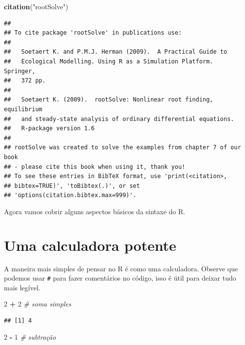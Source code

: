 \documentclass[
]{article}
\newenvironment{Shaded}{\begin{snugshade}}{\end{snugshade}}
\newcommand{\CommentTok}[1]{\textcolor[rgb]{0.56,0.35,0.01}{\textit{#1}}}
\newcommand{\DecValTok}[1]{\textcolor[rgb]{0.00,0.00,0.81}{#1}}
\newcommand{\KeywordTok}[1]{\textcolor[rgb]{0.13,0.29,0.53}{\textbf{#1}}}
\newcommand{\NormalTok}[1]{#1}
\newcommand{\OperatorTok}[1]{\textcolor[rgb]{0.81,0.36,0.00}{\textbf{#1}}}
\newcommand{\StringTok}[1]{\textcolor[rgb]{0.31,0.60,0.02}{#1}}
\begin{document}
\begin{Shaded}
\begin{Highlighting}[]
\KeywordTok{citation}\NormalTok{(}\StringTok{"rootSolve"}\NormalTok{)}
\end{Highlighting}
\end{Shaded}

\begin{verbatim}
## 
## To cite package 'rootSolve' in publications use:
## 
##   Soetaert K. and P.M.J. Herman (2009).  A Practical Guide to
##   Ecological Modelling. Using R as a Simulation Platform.  Springer,
##   372 pp.
## 
##   Soetaert K. (2009).  rootSolve: Nonlinear root finding, equilibrium
##   and steady-state analysis of ordinary differential equations.
##   R-package version 1.6
## 
## rootSolve was created to solve the examples from chapter 7 of our book
## - please cite this book when using it, thank you!
## To see these entries in BibTeX format, use 'print(<citation>,
## bibtex=TRUE)', 'toBibtex(.)', or set
## 'options(citation.bibtex.max=999)'.
\end{verbatim}

Agora vamos cobrir alguns aspectos básicos da sintaxe do R.

\hypertarget{uma-calculadora-potente}{%
\section{Uma calculadora potente}\label{uma-calculadora-potente}}

A maneira mais simples de pensar no R é como uma calculadora. Observe
que podemos usar \texttt{\#} para fazer comentários no código, isso é
útil para deixar tudo mais legível.

\begin{Shaded}
\begin{Highlighting}[]
\DecValTok{2} \OperatorTok{+}\StringTok{ }\DecValTok{2} \CommentTok{# soma simples}
\end{Highlighting}
\end{Shaded}

\begin{verbatim}
## [1] 4
\end{verbatim}

\begin{Shaded}
\begin{Highlighting}[]
\DecValTok{2} \OperatorTok{-}\StringTok{ }\DecValTok{1} \CommentTok{# subtração}
\end{Highlighting}
\end{Shaded}
\end{document}
